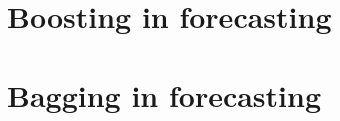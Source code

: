 \documentclass[11pt]{article}
\newcommand{\pkg}[1]{{\normalfont\fontseries{b}\selectfont #1}}
\let\proglang=\textsf
\begin{document}

\section{Boosting in forecasting}
\label{sec:boosting}
\section{Bagging in forecasting}
\label{sec:bagging}




\end{document}
